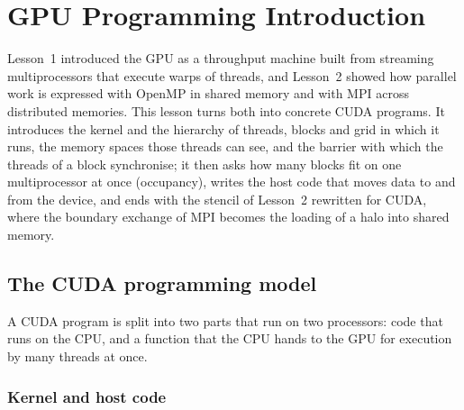 \documentclass[../main.tex]{subfiles}
\begin{document}
\chapter{GPU Programming Introduction}

Lesson~1 introduced the GPU as a throughput machine built from streaming
multiprocessors that execute warps of threads, and Lesson~2 showed how
parallel work is expressed with OpenMP in shared memory and with MPI
across distributed memories.  This lesson turns both into concrete CUDA
programs.  It introduces the kernel and the hierarchy of threads, blocks
and grid in which it runs, the memory spaces those threads can see, and
the barrier with which the threads of a block synchronise; it then asks
how many blocks fit on one multiprocessor at once (occupancy), writes the
host code that moves data to and from the device, and ends with the
stencil of Lesson~2 rewritten for CUDA, where the boundary exchange of
MPI becomes the loading of a halo into shared memory.

\section{The CUDA programming model}
\label{sec:l03-cuda}

A CUDA program is split into two parts that run on two processors: code
that runs on the CPU, and a function that the CPU hands to the GPU for
execution by many threads at once.

\subsection{Kernel and host code}
\end{document}
